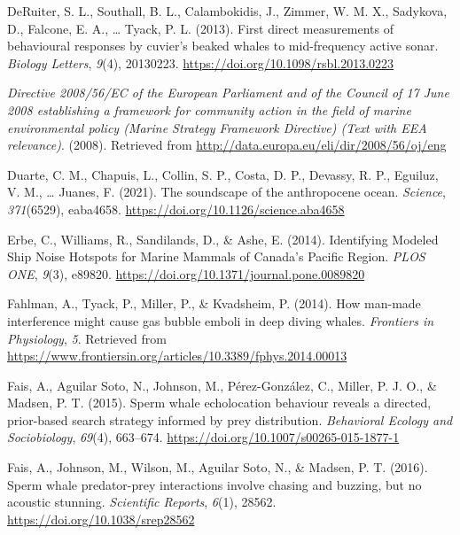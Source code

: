 \documentclass[
]{article}
\newlength{\cslhangindent}
\newlength{\cslentryspacingunit} %
\newenvironment{CSLReferences}[2] %
 {%
  \setlength{\parindent}{0pt}
  \ifodd #1
  \let\oldpar\par
  \def\par{\hangindent=\cslhangindent\oldpar}
  \fi
  \setlength{\parskip}{#2\cslentryspacingunit}
 }%
 {}
\begin{document}
\begin{CSLReferences}{1}{0}
\leavevmode{}%
DeRuiter, S. L., Southall, B. L., Calambokidis, J., Zimmer, W. M. X.,
Sadykova, D., Falcone, E. A., \ldots{} Tyack, P. L. (2013). First direct
measurements of behavioural responses by cuvier's beaked whales to
mid-frequency active sonar. \emph{Biology Letters}, \emph{9}(4),
20130223. \url{https://doi.org/10.1098/rsbl.2013.0223}

\leavevmode{}%
\emph{Directive 2008/56/EC of the European Parliament and of the Council
of 17 June 2008 establishing a framework for community action in the
field of marine environmental policy (Marine Strategy Framework
Directive) (Text with EEA relevance)}. (2008). Retrieved from
\url{http://data.europa.eu/eli/dir/2008/56/oj/eng}

\leavevmode{}%
Duarte, C. M., Chapuis, L., Collin, S. P., Costa, D. P., Devassy, R. P.,
Eguiluz, V. M., \ldots{} Juanes, F. (2021). The soundscape of the
anthropocene ocean. \emph{Science}, \emph{371}(6529), eaba4658.
\url{https://doi.org/10.1126/science.aba4658}

\leavevmode{}%
Erbe, C., Williams, R., Sandilands, D., \& Ashe, E. (2014). Identifying
Modeled Ship Noise Hotspots for Marine Mammals of Canada's Pacific
Region. \emph{PLOS ONE}, \emph{9}(3), e89820.
\url{https://doi.org/10.1371/journal.pone.0089820}

\leavevmode{}%
Fahlman, A., Tyack, P., Miller, P., \& Kvadsheim, P. (2014). How
man-made interference might cause gas bubble emboli in deep diving
whales. \emph{Frontiers in Physiology}, \emph{5}. Retrieved from
\url{https://www.frontiersin.org/articles/10.3389/fphys.2014.00013}

\leavevmode{}%
Fais, A., Aguilar Soto, N., Johnson, M., Pérez-González, C., Miller, P.
J. O., \& Madsen, P. T. (2015). Sperm whale echolocation behaviour
reveals a directed, prior-based search strategy informed by prey
distribution. \emph{Behavioral Ecology and Sociobiology}, \emph{69}(4),
663--674. \url{https://doi.org/10.1007/s00265-015-1877-1}

\leavevmode{}%
Fais, A., Johnson, M., Wilson, M., Aguilar Soto, N., \& Madsen, P. T.
(2016). Sperm whale predator-prey interactions involve chasing and
buzzing, but no acoustic stunning. \emph{Scientific Reports},
\emph{6}(1), 28562. \url{https://doi.org/10.1038/srep28562}


\end{CSLReferences}
\end{document}
